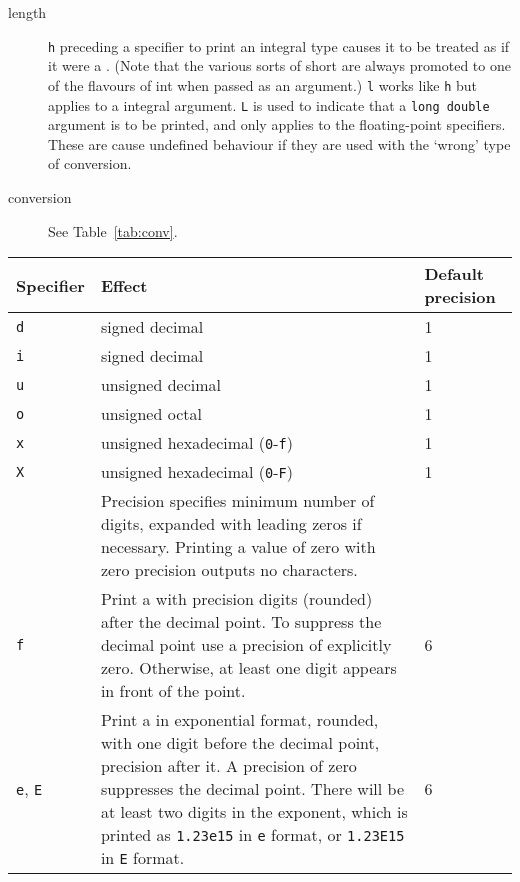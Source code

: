 \begin{description}
   \item[length] \texttt{h} preceding a specifier to print an integral type  causes
    it  to  be treated as if it were a \short.  (Note that the
    various sorts of short are always promoted to one of  the flavours of int
    when passed as an argument.) \texttt{l} works like \texttt{h} but
    applies to a \klong{} integral argument.  \texttt{L} is used
    to indicate  that  a  \texttt{long double} argument is to be printed,
    and only applies to the floating-point specifiers.  These are  cause
    undefined behaviour if they are used with the `wrong' type of
    conversion.

   \item[conversion] See Table~\ref{tab:conv}.
   \end{description}

\begin{table}[htb]
  \centering
      \begin{tabular}{lp{}p{}}
    \toprule
        Specifier & Effect & Default precision    \\
    \midrule
        \texttt{d} & signed decimal & 1    \\
        \texttt{i} & signed decimal & 1    \\
        \texttt{u} & unsigned decimal & 1    \\
        \texttt{o} & unsigned octal & 1    \\
        \texttt{x} & unsigned hexadecimal (\texttt{0}-\texttt{f}) & 1    \\
        \texttt{X} & unsigned hexadecimal (\texttt{0}-\texttt{F}) & 1    \\
                  & Precision specifies minimum number of digits, expanded
                    with leading zeros if necessary.  Printing a value
                    of zero with zero precision outputs no characters. &     \\
        \texttt{f} & Print a \double{} with precision
                     digits (rounded) after the decimal point.  To suppress
                     the decimal point use a precision of explicitly zero.
                     Otherwise, at least one digit
                     appears in front of the point. & 6    \\

        \texttt{e},
        \texttt{E} & Print a \double{} in exponential format,
                     rounded, with one digit before the decimal point,
                     precision after it.  A
                     precision of zero suppresses the decimal point.
                     There will be at least two digits in the exponent,
                     which is printed as
                     \texttt{1.23e15} in \texttt{e} format, or \texttt{1.23E15}
                     in \texttt{E} format. & 6    \\


\end{tabular}
\end{table}
